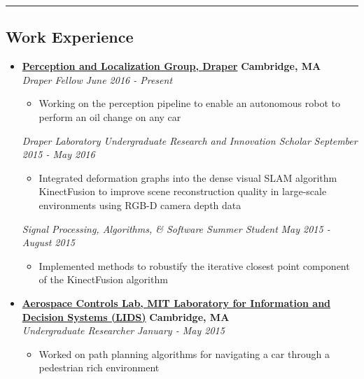 \documentclass[10pt,letterpaper]{article}
\begin{document}
\hrule
\vspace{-0.6em}

\subsection*{Work Experience}
  \begin{itemize}
    \parskip=-0.1em

    \item[]
    {\href{http://draper.com/}{\textbf{Perception and Localization Group, Draper}} \hfill
      \textbf{Cambridge, MA}}
    \\
        {\emph{Draper Fellow} \hfill \emph{June 2016 - Present}}
	
	\begin{itemize}[label=\textbullet]
	\itemsep0em 
	\item Working on the perception pipeline to enable an autonomous robot to perform an oil change on any car
	\end{itemize} 
    {\emph{Draper Laboratory Undergraduate Research and Innovation Scholar} \hfill \emph{September 2015 - May 2016}}
	
	\begin{itemize}[label=\textbullet]
	\itemsep0em 
	\item Integrated deformation graphs into the dense visual SLAM  algorithm KinectFusion to improve scene reconstruction quality in large-scale environments using RGB-D camera depth data
	\end{itemize} 
		{\emph{Signal Processing, Algorithms, \& Software Summer Student} \hfill \emph{May 2015 - August 2015}}
	\begin{itemize}[label=\textbullet]
	\item Implemented methods to robustify the iterative closest point component of the KinectFusion algorithm 
	
\end{itemize}

    \item[]
    {\href{http://acl.mit.edu/}{\textbf{Aerospace Controls Lab, MIT Laboratory for Information and Decision Systems (LIDS)}} \hfill
      \textbf{Cambridge, MA}}
    \\
    {\emph{Undergraduate Researcher} \hfill \emph{January - May 2015}}
	
	\begin{itemize}[label=\textbullet]
	\itemsep0em 
	\item Worked on path planning algorithms for navigating a car through a pedestrian rich environment
	

\end{itemize}
\end{itemize}
\end{document}
